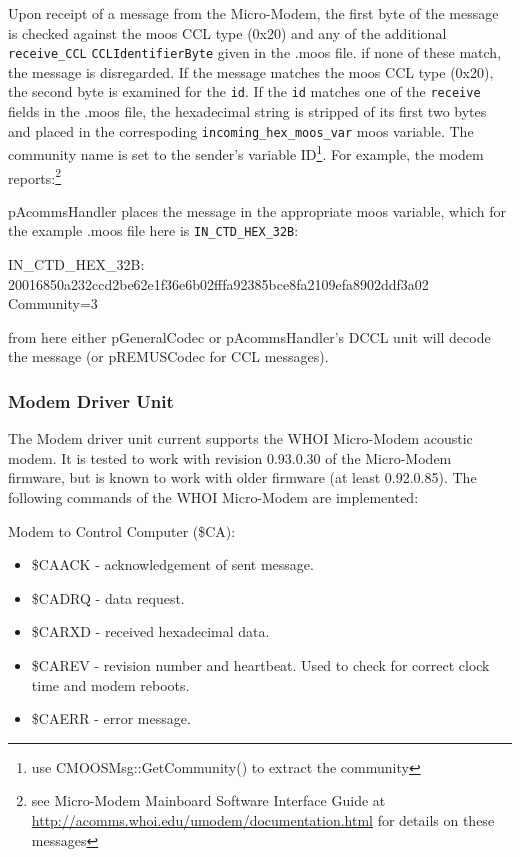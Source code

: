 \documentclass[11pt, letterpaper, oneside]{memoir}
\begin{document}
\begin{itemize}
Upon receipt of a message from the Micro-Modem, the first byte of the message is
checked against the moos CCL type (0x20) and any of the additional
\verb|receive_CCL| \verb|CCLIdentifierByte| given in the .moos
file. if none of these match, the message is disregarded. If the
message matches the moos CCL type (0x20), the second byte is examined
for the \verb|id|. If the \verb|id| matches one of the
\verb|receive| fields in the .moos file, the hexadecimal string is
stripped of its first two bytes and placed in the correspoding
\verb|incoming_hex_moos_var| moos variable. The community name is set to the
sender's variable ID\footnote{use CMOOSMsg::GetCommunity() to extract
  the community}. For example, the modem reports:\footnote{see Micro-Modem Mainboard Software Interface
  Guide at \url{http://acomms.whoi.edu/umodem/documentation.html} for
  details on these messages}
\resetbvlinenumber %

pAcommsHandler places the message in the appropriate moos variable, which
for the example .moos file here is \verb|IN_CTD_HEX_32B|:

\begin{boxedverbatim}
IN_CTD_HEX_32B: 20016850a232ccd2be62e1f36e6b02fffa92385bce8fa2109efa8902ddf3a02 
{Community=3}
\end{boxedverbatim}
\resetbvlinenumber

from here either pGeneralCodec or pAcommsHandler's DCCL unit will decode the message (or pREMUSCodec for CCL messages). 

\subsubsection{Modem Driver Unit}

The Modem driver unit current supports the WHOI Micro-Modem acoustic modem. It is tested to work with revision 0.93.0.30 of the Micro-Modem firmware, but is known to work with older firmware (at least 0.92.0.85). The following commands of the WHOI Micro-Modem are implemented:

Modem to Control Computer (\$CA):
\begin{itemize}
\item \$CAACK - acknowledgement of sent message. 
\item \$CADRQ - data request. 
\item \$CARXD - received hexadecimal data.
\item \$CAREV - revision number and heartbeat. Used to check for correct clock time and modem reboots.
\item \$CAERR - error message.
\end{itemize}


\end{itemize}
\end{document}
